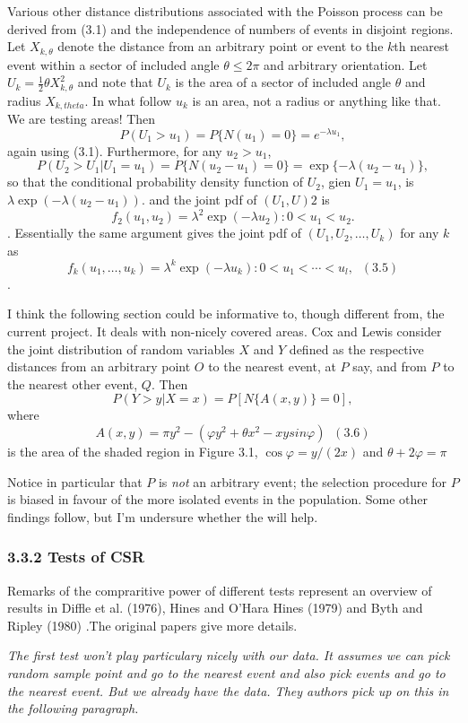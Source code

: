 \documentclass{article}
\begin{document}
Various other distance distributions associated with the Poisson process can be derived from (3.1) and the independence of numbers of events in disjoint regions. Let $X_{k, \theta}$ denote the distance from an arbitrary point or event to the $k$th nearest event within a sector of included angle $\theta \leq 2\pi$ and arbitrary orientation.  Let $U_k = \frac{1}{2}\theta X_{k, \theta}^2$ and note that $U_k$ is the area of a sector of included angle $\theta$ and radius $X_{k, theta}$. In what follow $u_k$ is an area, not a radius or anything like that. We are testing areas! Then $$P(U_1 > u_1) = P\{N(u_1) = 0 \} = e^{-\lambda u_1},$$ again using (3.1). Furthermore, for any $u_2 > u_1$, $$P(U_2 > U_1 | U_1 = u_1) = P\{N(u_2 - u_1) = 0\} = \exp \{ -\lambda (u_2 - u_1) \},$$ so that the conditional probability density function of $U_2$, gien $U_1 = u_1$, is $\lambda \exp (-\lambda(u_2 - u_1))$. and the joint pdf of $(U_1, U)2$ is $$f_2(u_1, u_2) = \lambda^2\exp(-\lambda u_2):0<u_1<u_2.$$. Essentially the same argument gives the joint pdf of $(U_1, U_2, \dots, U_k)$ for any $k$ as $$f_k(u_1, \dots, u_k) = \lambda^k \exp(-\lambda u_k) : 0 <u_1 < \cdots < u_l, \; \; (3.5)$$. 

I think the following section could be  informative to, though different from, the current project. It deals with non-nicely covered areas. Cox and Lewis consider the joint distribution of random variables $X$ and $Y$ defined as the respective distances from an arbitrary point $O$ to the nearest event, at $P$ say, and from $P$ to the nearest other event, $Q$. Then $$P(Y > y | X = x) = P[N\{ A(x, y)\} = 0],$$ where $$A(x,y) = \pi y^2 - (\varphi y^2 + \theta x^2 - xysin \varphi)\; \; (3.6) $$ is the area of the shaded region in Figure 3.1, $\cos \varphi = y/(2x)$ and $\theta + 2\varphi = \pi$

Notice in particular that $P$ is {\it not} an arbitrary event; the selection procedure for $P$ is biased in favour of the more isolated events in the population. Some other findings follow, but I'm undersure whether the will help. 
\subsubsection*{3.3.2 Tests of CSR}
Remarks of the compraritive power of different tests represent an overview of results in Diffle et al. (1976), Hines and O'Hara Hines (1979) and Byth and Ripley (1980) .The original papers give more details.

{\it The first test won't play particulary nicely with our data. It assumes we can pick random sample point and go to the nearest event and also pick events and go to the nearest event. But we already have the data. They authors pick up on this in the following paragraph.} 
\end{document}
